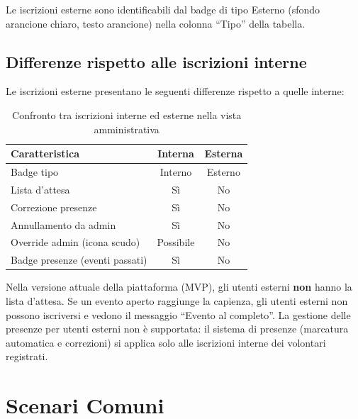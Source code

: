 \documentclass[a4paper,11pt,oneside]{book}
\begin{document}
Le iscrizioni esterne sono identificabili dal badge di tipo \textcolor{namoOrange}{Esterno} (sfondo arancione chiaro, testo arancione) nella colonna ``Tipo'' della tabella.

\subsection{Differenze rispetto alle iscrizioni interne}

Le iscrizioni esterne presentano le seguenti differenze rispetto a quelle interne:

\begin{table}[htbp]
\centering
\caption{Confronto tra iscrizioni interne ed esterne nella vista amministrativa}
\label{tab:confronto-iscrizioni}
\begin{tabularx}{\textwidth}{X c c}
\toprule
\textbf{Caratteristica} & \textbf{Interna} & \textbf{Esterna} \\
\midrule
Badge tipo                            & \textcolor{namoCyan}{Interno}   & \textcolor{namoOrange}{Esterno} \\
Lista d'attesa                        & S\`i           & No \\
Correzione presenze                   & S\`i           & No \\
Annullamento da admin                 & S\`i           & No \\
Override admin (icona scudo)          & Possibile      & No \\
Badge presenze (eventi passati)       & S\`i           & No \\
\bottomrule
\end{tabularx}
\end{table}

\begin{infobox}
Nella versione attuale della piattaforma (MVP), gli utenti esterni \textbf{non} hanno la lista d'attesa. Se un evento aperto raggiunge la capienza, gli utenti esterni non possono iscriversi e vedono il messaggio ``Evento al completo''. La gestione delle presenze per utenti esterni non \`e supportata: il sistema di presenze (marcatura automatica e correzioni) si applica solo alle iscrizioni interne dei volontari registrati.
\end{infobox}

\section{Scenari Comuni}
\label{sec:scenari-comuni}
\end{document}

